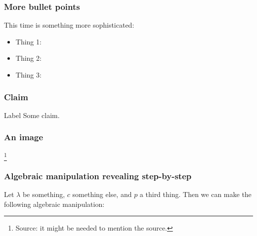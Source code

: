 \documentclass{beamer}
\begin{document}
\begin{frame}
\frametitle{More bullet points}

This time is something more sophisticated:

    \begin{itemize}
        \item<2-> Thing 1:
            \only<3->{Remark}
        \item<4-> Thing 2:
        \item<6-> Thing 3:
    \end{itemize}
    
\end{frame}

\begin{frame}
\frametitle{Claim}

    \begin{block}{Label}
       Some claim.
    \end{block}

\end{frame}

\begin{frame}
    \frametitle{An image}
    
        \begin{center}
            \footnote{Source: it might be needed to mention the source.}
        \end{center}
\end{frame}

\begin{frame}
    \frametitle{Algebraic manipulation revealing step-by-step}

    \begin{corollary}[Label]
        Let $\lambda$ be something, $c$ something else, and $p$ a third thing. Then we can make the following algebraic manipulation:
    
        
    \end{corollary}
    

\end{frame}
\end{document}
